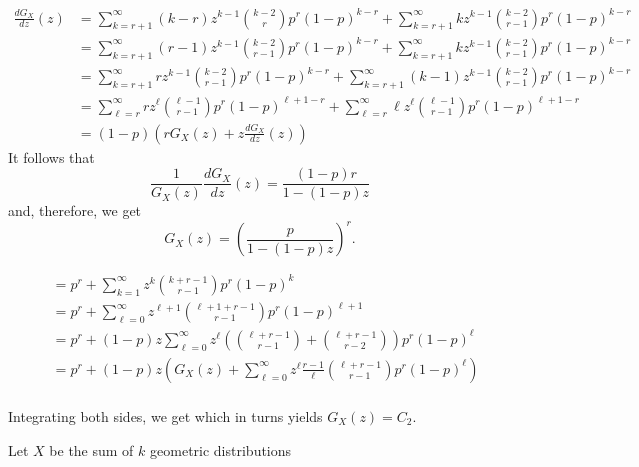 \begin{example}
\begin{equation*}
\end{equation*}
\begin{equation*}
\begin{split}
\frac{d G_X}{dz} (z)
&= \sum_{k=r+1}^{\infty}(k-r) z^{k-1} \binom{k-2}{r} p^r (1-p)^{k-r}
+ \sum_{k=r+1}^{\infty} k z^{k-1} \binom{k-2}{r-1} p^r (1-p)^{k-r} \\
&= \sum_{k=r+1}^{\infty}(r-1) z^{k-1} \binom{k-2}{r-1} p^r (1-p)^{k-r}
+ \sum_{k=r+1}^{\infty} k z^{k-1} \binom{k-2}{r-1} p^r (1-p)^{k-r} \\
&= \sum_{k=r+1}^{\infty}r z^{k-1} \binom{k-2}{r-1} p^r (1-p)^{k-r}
+ \sum_{k=r+1}^{\infty} (k-1) z^{k-1} \binom{k-2}{r-1} p^r (1-p)^{k-r} \\
&= \sum_{\ell=r}^{\infty}r z^\ell \binom{\ell-1}{r-1} p^r (1-p)^{\ell+1-r}
+ \sum_{\ell=r}^{\infty} \ell z^{\ell} \binom{\ell-1}{r-1} p^r (1-p)^{\ell+1-r} \\
&= (1-p) \left( r G_X(z) + z \frac{d G_X}{dz} (z) \right)
\end{split}
\end{equation*}
It follows that
\begin{equation*}
\frac{1}{G_X(z)} \frac{d G_X}{dz}(z) = \frac{(1-p) r}{1 - (1-p) z}
\end{equation*}
and, therefore, we get
\begin{equation*}
G_X(z) = \left( \frac{p}{1 - (1-p) z} \right)^r .
\end{equation*}

\begin{equation*}
\begin{split}
&= p^r + \sum_{k=1}^{\infty} z^k \binom{k+r-1}{r-1} p^r (1-p)^k \\
&= p^r + \sum_{\ell=0}^{\infty} z^{\ell+1} \binom{\ell+1+r-1}{r-1} p^r (1-p)^{\ell+1} \\
&= p^r + (1-p) z \sum_{\ell=0}^{\infty} z^{\ell} \left( \binom{\ell + r - 1}{r - 1} + \binom{\ell+r-1}{r-2} \right) p^r (1-p)^{\ell} \\
&= p^r + (1-p) z \left( G_X (z) + \sum_{\ell=0}^{\infty} z^{\ell} \frac{r-1}{\ell} \binom{\ell+r-1}{r-1} p^r (1-p)^{\ell} \right) \\
\end{split}
\end{equation*}

Integrating both sides, we get
which in turns yields $G_X(z) = C_2 $.

Let $X$ be the sum of $k$ geometric distributions
\end{example}

